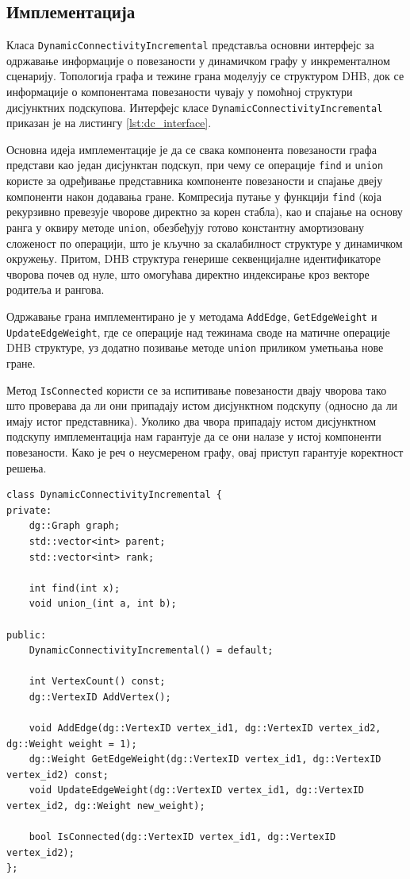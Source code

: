 \subsection{Имплементација}

Класа \texttt{Dynamic\allowbreak Connectivity\allowbreak Incremental} представља основни интерфејс за одржавање информације о повезаности у динамичком графу у инкременталном сценарију. Топологија графа и тежине грана моделују се структуром DHB, док се информације о компонентама повезаности чувају у помоћној структури дисјунктних подскупова. Интерфејс класе \texttt{Dynamic\allowbreak Connectivity\allowbreak Incremental} приказан је на листингу \ref{lst:dc_interface}.

Основна идеја имплементације је да се свака компонента повезаности графа представи као један дисјунктан подскуп, при чему се операције \texttt{find} и \texttt{union} користе за одређивање представника компоненте повезаности и спајање двеју компоненти након додавања гране. Компресија путање у функцији \texttt{find} (која рекурзивно превезује чворове директно за корен стабла), као и спајање на основу ранга у оквиру методе \texttt{union}, обезбеђују готово константну амортизовану сложеност по операцији, што је кључно за скалабилност структуре у динамичком окружењу. Притом, DHB структура  генерише секвенцијалне идентификаторе чворова почев од нуле, што омогућава директно индексирање кроз векторе родитеља и рангова.

Одржавање грана имплементирано је у методама \texttt{AddEdge}, \texttt{GetEdgeWeight} и \texttt{UpdateEdgeWeight}, где се операције над тежинама своде на матичне операције DHB структуре, уз додатно позивање методе \texttt{union} приликом уметњања нове гране.

Метод \texttt{IsConnected} користи се за испитивање повезаности двају чворова тако што проверава да ли они припадају истом дисјунктном подскупу (односно да ли имају истог представника). Уколико два чвора припадају истом дисјунктном подскупу имплементација нам гарантује да се они налазе у истој компоненти повезаности. Како је реч о неусмереном графу, овај приступ гарантује коректност решења.

\begin{lstlisting}[style=thesiscpp, caption={Интерфејс класе \texttt{DynamicConnectivityIncremental}}, label={lst:dc_interface}]
class DynamicConnectivityIncremental {
private:
    dg::Graph graph;
    std::vector<int> parent;
    std::vector<int> rank;

    int find(int x);
    void union_(int a, int b);

public:
    DynamicConnectivityIncremental() = default;

    int VertexCount() const;
    dg::VertexID AddVertex();
    
    void AddEdge(dg::VertexID vertex_id1, dg::VertexID vertex_id2, dg::Weight weight = 1);
    dg::Weight GetEdgeWeight(dg::VertexID vertex_id1, dg::VertexID vertex_id2) const;
    void UpdateEdgeWeight(dg::VertexID vertex_id1, dg::VertexID vertex_id2, dg::Weight new_weight);

    bool IsConnected(dg::VertexID vertex_id1, dg::VertexID vertex_id2);
};
\end{lstlisting}

